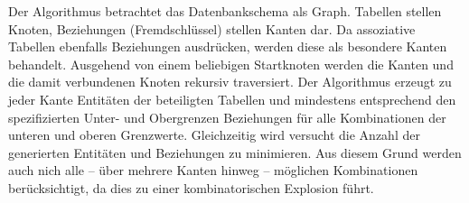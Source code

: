 	




Der Algorithmus betrachtet das Datenbankschema als Graph. 
%
Tabellen stellen Knoten, Beziehungen (Fremdschlüssel) stellen Kanten dar.
%
Da assoziative Tabellen ebenfalls Beziehungen ausdrücken, werden diese als besondere Kanten behandelt. 
%
%
Ausgehend von einem beliebigen Startknoten werden die Kanten und die damit verbundenen Knoten rekursiv traversiert.
%
Der Algorithmus erzeugt zu jeder Kante Entitäten der beteiligten Tabellen und mindestens entsprechend den spezifizierten Unter- und Obergrenzen Beziehungen für alle Kombinationen der unteren und oberen Grenzwerte.
%
Gleichzeitig wird versucht die Anzahl der generierten Entitäten und Beziehungen zu minimieren.
%
Aus diesem Grund werden auch nich alle --  über mehrere Kanten hinweg -- möglichen Kombinationen berücksichtigt, da dies zu einer kombinatorischen Explosion führt. 


